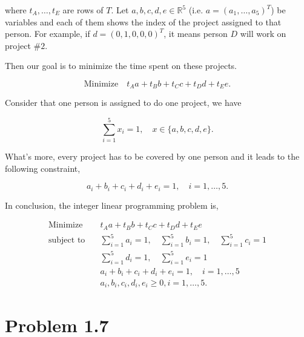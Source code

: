 \documentclass[12pt]{article}
\begin{document}
where $t_A, \dots, t_E$ are rows of $T$. Let $a, b, c, d, e \in \mathbb{R}^5$ (i.e. $a = (a_1, \dots, a_5)^T$) be variables and each of them shows the index of the project assigned to that person. For example, if $d = (0, 1, 0, 0, 0)^T$, it means person $D$ will work on project $\# 2$. 

Then our goal is to minimize the time spent on these projects.

$$
\text{Minimize} \quad t_Aa + t_Bb + t_Cc + t_Dd + t_Ee.
$$

Consider that one person is assigned to do one project, we have 

$$
\sum_{i = 1}^5 x_i = 1, \quad x \in \{a, b, c, d, e\}.
$$

What's more, every project has to be covered by one person and it leads to the following constraint,

$$
a_i + b_i + c_i + d_i + e_i = 1, \quad i = 1, \dots, 5.
$$

In conclusion, the integer linear programming problem is,

\begin{equation*}
\begin{aligned}
\text{Minimize} \quad & t_Aa + t_Bb + t_Cc + t_Dd + t_Ee \\
\text{subject\  to} \quad & \sum_{i = 1}^5 a_i = 1, \quad \sum_{i = 1}^5 b_i = 1, \quad \sum_{i = 1}^5 c_i = 1 \\
& \sum_{i = 1}^5 d_i = 1, \quad \sum_{i = 1}^5 e_i = 1 \\
& a_i + b_i + c_i + d_i + e_i = 1, \quad i = 1, \dots, 5 \\
& a_i, b_i, c_i, d_i, e_i \geqslant 0, i = 1, \dots, 5.
\end{aligned}
\end{equation*}



\section*{Problem 1.7}
\end{document}
